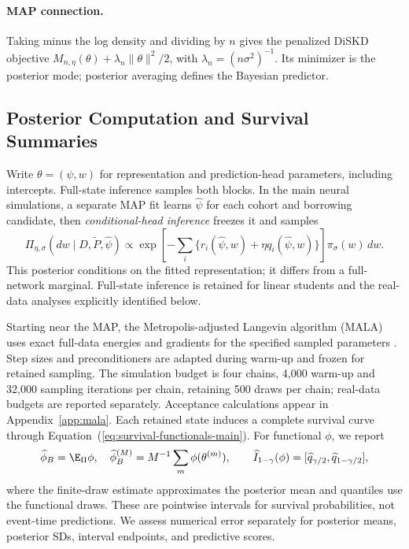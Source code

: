 \documentclass{article} %
\renewcommand{\eqref}[1]{\textup{(\ref{#1})}}
\begin{document}
\paragraph{MAP connection.}
Taking minus the log density and dividing by $n$ gives the penalized DiSKD objective $M_{n,\eta}(\theta)+\lambda_n\|\theta\|^2/2$, with $\lambda_n=(n\sigma^2)^{-1}$. Its minimizer is the posterior mode; posterior averaging defines the Bayesian predictor.

\subsection{Posterior Computation and Survival Summaries}
\label{sec:mala-inference-main}
Write $\theta=(\psi,w)$ for representation and prediction-head parameters, including intercepts. Full-state inference samples both blocks. In the main neural simulations, a separate MAP fit learns $\widehat\psi$ for each cohort and borrowing candidate, then \emph{conditional-head inference} freezes it and samples
\begin{equation}
\Pi_{\eta,\sigma}(dw\mid D,\widetilde P,\widehat\psi)
\propto\exp\!\left[-\sum_i\{r_i(\widehat\psi,w)+\eta q_i(\widehat\psi,w)\}\right]\pi_\sigma(w)\,dw.
\label{eq:head-posterior-main}
\end{equation}
This posterior conditions on the fitted representation; it differs from a full-network marginal. Full-state inference is retained for linear students and the real-data analyses explicitly identified below.

Starting near the MAP, the Metropolis-adjusted Langevin algorithm (MALA) uses exact full-data energies and gradients for the specified sampled parameters \citep{roberts1998}. Step sizes and preconditioners are adapted during warm-up and frozen for retained sampling. The simulation budget is four chains, 4,000 warm-up and 32,000 sampling iterations per chain, retaining 500 draws per chain; real-data budgets are reported separately. Acceptance calculations appear in Appendix~\ref{app:mala}. Each retained state induces a complete survival curve through Equation~\eqref{eq:survival-functionals-main}. For functional $\phi$, we report
\begin{equation}
\widehat\phi_B=\E_\Pi\phi,\quad\widehat\phi_B^{(M)}=M^{-1}\sum_m\phi(\theta^{(m)}),\qquad
\widehat I_{1-\gamma}(\phi)=[\widehat q_{\gamma/2},\widehat q_{1-\gamma/2}],
\label{eq:posterior-mean-main}
\end{equation}
where the finite-draw estimate approximates the posterior mean and quantiles use the functional draws. These are pointwise intervals for survival probabilities, not event-time predictions. We assess numerical error separately for posterior means, posterior SDs, interval endpoints, and predictive scores.
\end{document}
